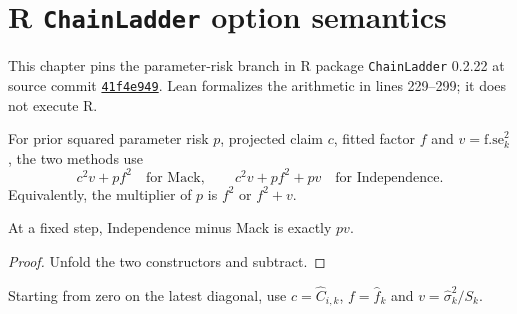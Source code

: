 \chapter{R \texttt{ChainLadder} option semantics}
\enlargethispage{2\baselineskip}

This chapter pins the parameter-risk branch in R package \texttt{ChainLadder}
0.2.22 at source commit
\href{https://github.com/mages/ChainLadder/blob/41f4e949e5c3bffd7a18af2c0eaa98d6bae2da2f/R/MackChainLadderFunctions.R\#L229-L299}{\texttt{41f4e949}}.
Lean formalizes the arithmetic in lines 229--299; it does not execute R.

\begin{definition}\label{def:r_parameter_step}
\leanok
For prior squared parameter risk $p$, projected claim $c$, fitted factor $f$
and $v=\mathrm{f.se}_k^2$, the two methods use
\[
 c^2v+pf^2 \quad\text{for Mack},\qquad
 c^2v+pf^2+pv \quad\text{for Independence}.
\]
Equivalently, the multiplier of $p$ is $f^2$ or $f^2+v$.
\end{definition}

\begin{theorem}\label{thm:r_parameter_step}
\leanok
{}
At a fixed step, Independence minus Mack is exactly $pv$.
\end{theorem}
\begin{proof}\leanok Unfold the two constructors and subtract. \end{proof}

\begin{definition}\label{def:r_row_recursion}
\leanok
{}
Starting from zero on the latest diagonal, use $c=\hat C_{i,k}$,
$f=\hat f_k$ and $v=\hat\sigma_k^2/S_k$.
\end{definition}

